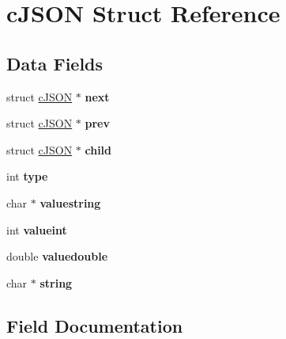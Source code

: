 \hypertarget{structc_j_s_o_n}{}\section{c\+J\+S\+ON Struct Reference}
\label{structc_j_s_o_n}
\subsection*{Data Fields}
\begin{DoxyCompactItemize}
\item 
\mbox{\label{structc_j_s_o_n_ade862b880379b5e2a591f7326401fa8d}} 
struct \hyperlink{structc_j_s_o_n}{c\+J\+S\+ON} $\ast$ {\bfseries next}
\item 
\mbox{\label{structc_j_s_o_n_a488a393f610347821fce8e985e79fc2f}} 
struct \hyperlink{structc_j_s_o_n}{c\+J\+S\+ON} $\ast$ {\bfseries prev}
\item 
\mbox{\label{structc_j_s_o_n_a401b274c2da358dac5c23ab8b2c71f85}} 
struct \hyperlink{structc_j_s_o_n}{c\+J\+S\+ON} $\ast$ {\bfseries child}
\item 
\mbox{\label{structc_j_s_o_n_ab13084c574681593b12f6e0a3db0dcfc}} 
int {\bfseries type}
\item 
\mbox{\label{structc_j_s_o_n_ad43f8de2571e504c4c5ce0a36990e6e1}} 
char $\ast$ {\bfseries valuestring}
\item 
\mbox{\label{structc_j_s_o_n_a369cea49494eb5d4409d532a731a0fbf}} 
int {\bfseries valueint}
\item 
\mbox{\label{structc_j_s_o_n_a4b21817d0fd2919901abadac73214e7f}} 
double {\bfseries valuedouble}
\item 
\mbox{\label{structc_j_s_o_n_aa6b47e9a4b0e0a26f519b1a2b6739983}} 
char $\ast$ {\bfseries string}
\end{DoxyCompactItemize}


\subsection{Field Documentation}
\mbox{\label{structc_j_s_o_n_a401b274c2da358dac5c23ab8b2c71f85}} 
